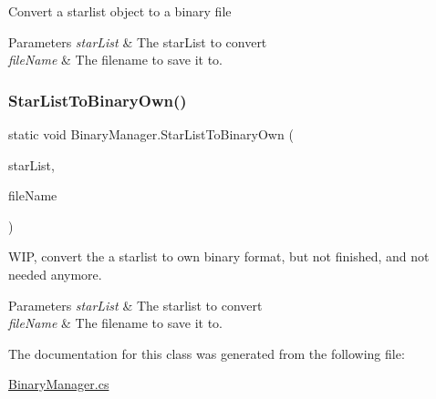 Convert a starlist object to a binary file 


\begin{DoxyParams}{Parameters}
{\em star\+List} & The star\+List to convert\\
\hline
{\em file\+Name} & The filename to save it to.\\
\hline
\end{DoxyParams}
\mbox{\label{class_binary_manager_a7a9e6671eb7c5a003e5f0d1959268d5d}} 
\subsubsection{\texorpdfstring{StarListToBinaryOwn()}{StarListToBinaryOwn()}}
{\footnotesize\ttfamily static void Binary\+Manager.\+Star\+List\+To\+Binary\+Own (\begin{DoxyParamCaption}\item[{\mbox{\hyperlink{class_star_list}{Star\+List}}}]{star\+List,  }\item[{string}]{file\+Name }\end{DoxyParamCaption})\hspace{0.3cm}{\ttfamily [static]}}



W\+IP, convert the a starlist to own binary format, but not finished, and not needed anymore. 


\begin{DoxyParams}{Parameters}
{\em star\+List} & The starlist to convert\\
\hline
{\em file\+Name} & The filename to save it to.\\
\hline
\end{DoxyParams}


The documentation for this class was generated from the following file\+:\begin{DoxyCompactItemize}
\item 
\mbox{\hyperlink{_binary_manager_8cs}{Binary\+Manager.\+cs}}\end{DoxyCompactItemize}
